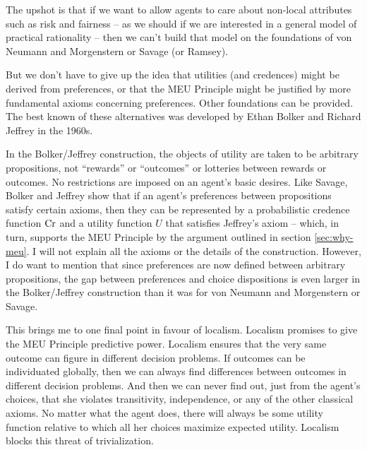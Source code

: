 
The upshot is that if we want to allow agents to care about non-local
attributes such as risk and fairness -- as we should if we are
interested in a general model of practical rationality -- then we
can't build that model on the foundations of von Neumann and
Morgenstern or Savage (or Ramsey).

But we don't have to give up the idea that utilities (and credences)
might be derived from preferences, or that the MEU Principle might be
justified by more fundamental axioms concerning preferences. Other
foundations can be provided. The best known of these alternatives was
developed by Ethan Bolker and Richard Jeffrey in the 1960s.

In the Bolker/Jeffrey construction, the objects of utility are taken
to be arbitrary propositions, not ``rewards'' or ``outcomes'' or
lotteries between rewards or outcomes. No restrictions are imposed on
an agent's basic desires. Like Savage, Bolker and Jeffrey show that if
an agent's preferences between propositions satisfy certain axioms,
then they can be represented by a probabilistic credence function
$\text{Cr}$ and a utility function $U$ that satisfies Jeffrey's axiom --
which, in turn, supports the MEU Principle by the argument outlined in
section \ref{sec:why-meu}. I will not explain all the axioms or the
details of the construction. However, I do want to mention that
since preferences are now defined between arbitrary propositions, the gap
between preferences and choice dispositions is even larger in the
Bolker/Jeffrey construction than it was for von Neumann and
Morgenstern or Savage. %

This brings me to one final point in favour of localism. Localism
promises to give the MEU Principle predictive power. Localism ensures
that the very same outcome can figure in different decision problems.
If outcomes can be individuated globally, then we can always find
differences between outcomes in different decision problems. And then
we can never find out, just from the agent's choices, that she
violates transitivity, independence, or any of the other classical
axioms. No matter what the agent does, there will always be some
utility function relative to which all her choices maximize expected
utility. Localism blocks this threat of trivialization.

